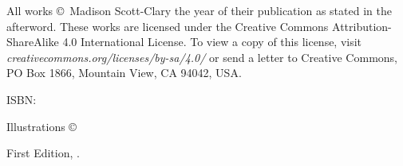 \singlespacing
\thispagestyle{empty}
\null
\vfill
{\small\parindent0pt
\noindent All works \copyright\ Madison Scott-Clary the year of their publication as stated in the afterword. These works are licensed under the Creative Commons Attribution-ShareAlike 4.0 International License. To view a copy of this license, visit \mbox{\emph{creativecommons.org/licenses/by-sa/4.0/}} or send a letter to Creative Commons, PO Box 1866, Mountain View, CA 94042, USA.

\vspace{1ex}

ISBN: \ISBN

\vspace{1ex}

\emph{\Title}

\vspace{1ex}

Illustrations \copyright\ \Year\ \Illustrator\\
\IllustratorWeb

\vspace{1ex}

First Edition, \Year.

\EditionsList
}

\cleardoublepage
